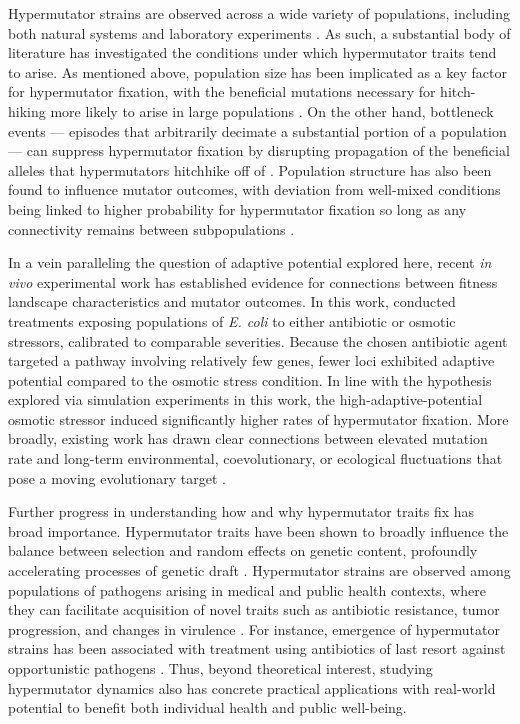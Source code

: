 Hypermutator strains are observed across a wide variety of populations, including both natural systems and laboratory experiments \citep{sniegowski1997evolution,swings2017adaptive,maddamsetti2020divergent,cherry2018methylation,notleymcrobb2002enrichment,shaver2002fitness,voordeckers2015adaptation,leclerc1996high}.
As such, a substantial body of literature has investigated the conditions under which hypermutator traits tend to arise.
As mentioned above, population size has been implicated as a key factor for hypermutator fixation, with the beneficial mutations necessary for hitch-hiking more likely to arise in large populations \citep{raynes2018sign}.
On the other hand, bottleneck events --- episodes that arbitrarily decimate a substantial portion of a population --- can suppress hypermutator fixation by disrupting propagation of the beneficial alleles that hypermutators hitchhike off of \citep{raynes2013effect}.
Population structure has also been found to influence mutator outcomes, with deviation from well-mixed conditions being linked to higher probability for hypermutator fixation so long as any connectivity remains between subpopulations \citep{raynes2019migration}.

In a vein paralleling the question of adaptive potential explored here, recent \textit{in vivo} experimental work has established evidence for connections between fitness landscape characteristics and mutator outcomes.
In this work, \citet{callens2023hypermutator} conducted treatments exposing populations of \textit{E. coli} to either antibiotic or osmotic stressors, calibrated to comparable severities.
Because the chosen antibiotic agent targeted a pathway involving relatively few genes, fewer loci exhibited adaptive potential compared to the osmotic stress condition.
In line with the hypothesis explored via simulation experiments in this work, the high-adaptive-potential osmotic stressor induced significantly higher rates of hypermutator fixation.
More broadly, existing work has drawn clear connections between elevated mutation rate and long-term environmental, coevolutionary, or ecological fluctuations that pose a moving evolutionary target \citep{leigh1970natural,travis2002mutator,rosenbloom2014frequencydependent,pal2007coevolution}.

Further progress in understanding how and why hypermutator traits fix has broad importance.
Hypermutator traits have been shown to broadly influence the balance between selection and random effects on genetic content, profoundly accelerating processes of genetic draft \citep{couce2017mutator}.
Hypermutator strains are observed among populations of pathogens arising in medical and public health contexts, where they can facilitate acquisition of novel traits such as antibiotic resistance, tumor progression, and changes in virulence \citep{eliopoulos2003hypermutation,jolivetgougeon2011bacterial,stern2016viral,schlesner2015hypermutation}.
For instance, emergence of hypermutator strains has been associated with treatment using antibiotics of last resort against opportunistic pathogens \citep{mehta2019essential}.
Thus, beyond theoretical interest, studying hypermutator dynamics also has concrete practical applications with real-world potential to benefit both individual health and public well-being.

